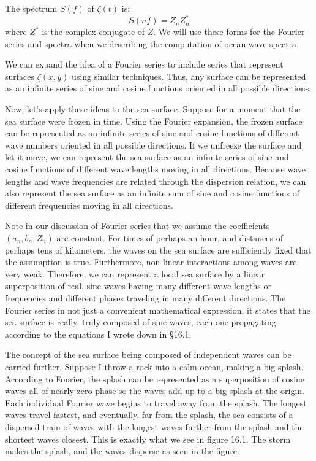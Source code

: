 The spectrum $S(f)$ of $\zeta (t)$ is:
\begin{equation}
S(nf) = Z_n Z^*_n
\end{equation}
where $Z^*$ is the complex conjugate of $Z$. We will use these forms for the
Fourier series and spectra when we describing the computation of ocean wave
spectra.

We can expand the idea of a Fourier series to include series that represent
surfaces $\zeta (x,y)$ using similar techniques. Thus, any surface can be
represented as an infinite series of sine and cosine functions oriented in all
possible directions.

Now, let's apply these ideas to the sea surface. Suppose for a moment that the
sea surface were frozen in time. Using the Fourier expansion, the frozen surface
can be represented as an infinite series of sine and cosine functions of
different wave numbers oriented in all possible directions. If we unfreeze the
surface and let it move, we can represent the sea surface as an
infinite series of sine and cosine functions of different wave lengths
moving in all directions. Because wave lengths and wave frequencies are related
through the dispersion relation, we can also represent the sea surface as an
infinite sum of sine and cosine functions of different frequencies moving in
all directions.

Note in our discussion of Fourier series that we assume the coefficients
$(a_n, b_n, Z_n)$ are constant. For times of perhaps an hour, and distances of
perhaps tens of kilometers, the waves on the sea surface are sufficiently
fixed that the assumption is true. Furthermore, non-linear interactions among
waves are very weak. Therefore, we can represent a local sea surface by a linear
superposition of real, sine waves having many different wave lengths or
frequencies and different phases traveling in many different directions. The
Fourier series in not just a convenient mathematical expression, it states that
the sea surface is really, truly composed of sine waves, each one propagating
according to the equations I wrote down in \S 16.1.

The concept of the sea surface being composed of independent waves can be carried further. Suppose I throw a rock into a calm ocean, making a big splash. According to Fourier, the splash can be represented as a superposition of cosine waves all of nearly zero phase so the waves add up to a big splash at the origin. Each individual Fourier wave begins to travel away from the splash. The longest waves travel fastest, and eventually, far from the splash, the sea consists of a dispersed train of waves with the longest waves further from the splash and the shortest waves closest. This is exactly what we see in figure 16.1. The storm makes the splash, and the waves disperse as seen in the figure.

